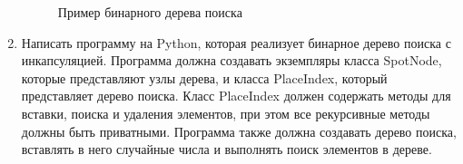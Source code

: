 \begin{enumerate}
\begin{figure}[h]
\centering
{}
\caption{Пример бинарного дерева поиска}
\end{figure}

\item Написать программу на Python, которая реализует бинарное дерево поиска с инкапсуляцией. Программа должна создавать экземпляры класса SpotNode, которые представляют узлы дерева, и класса PlaceIndex, который представляет дерево поиска. Класс PlaceIndex должен содержать методы для вставки, поиска и удаления элементов, при этом все рекурсивные методы должны быть приватными. Программа также должна создавать дерево поиска, вставлять в него случайные числа и выполнять поиск элементов в дереве.


\end{enumerate}
